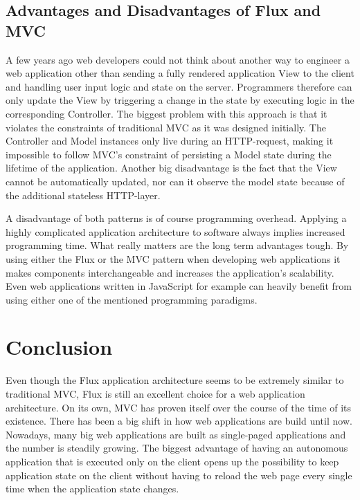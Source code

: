 \subsection{Advantages and Disadvantages of Flux and MVC}

A few years ago web developers could not think about another way to engineer a web application other than sending a fully rendered application View to the client and handling user input logic and state on the server. Programmers therefore can only update the View by triggering a change in the state by executing logic in the corresponding Controller. The biggest problem with this approach is that it violates the constraints of traditional MVC as it was designed initially. The Controller and Model instances only live during an HTTP-request, making it impossible to follow MVC's constraint of persisting a Model state during the lifetime of the application. Another big disadvantage is the fact that the View cannot be automatically updated, nor can it observe the model state because of the additional stateless HTTP-layer.

A disadvantage of both patterns is of course programming overhead. Applying a highly complicated application architecture to software always implies increased programming time. What really matters are the long term advantages tough. By using either the Flux or the MVC pattern when developing web applications it makes components interchangeable and increases the application's scalability. Even web applications written in JavaScript for example can heavily benefit from using either one of the mentioned programming paradigms.


\section{Conclusion}

Even though the Flux application architecture seems to be extremely similar to traditional MVC, Flux is still an excellent choice for a web application architecture. On its own, MVC has proven itself over the course of the time of its existence. There has been a big shift in how web applications are build until now. Nowadays, many big web applications are built as single-paged applications and the number is steadily growing. The biggest advantage of having an autonomous application that is executed only on the client opens up the possibility to keep application state on the client without having to reload the web page every single time when the application state changes.

